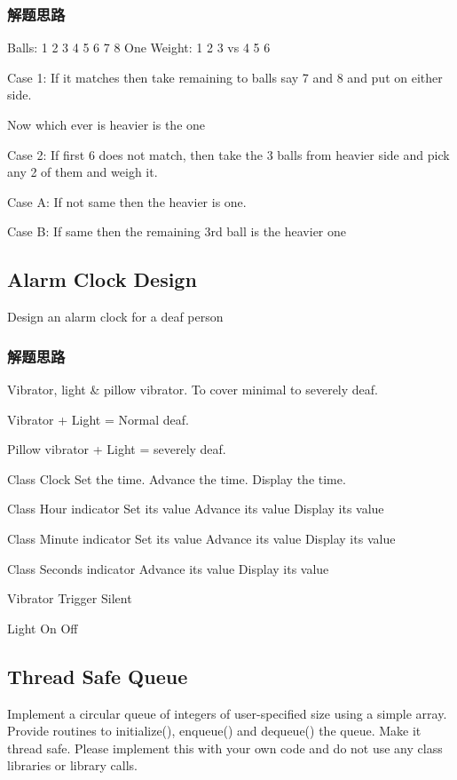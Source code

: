 \subsubsection{解题思路}
Balls: 1 2 3 4 5 6 7 8
One Weight: {1 2 3} vs {4 5 6}

Case 1: 
	If it matches then take remaining to balls say 7 and 8 and put on either side. 
	
	Now which ever is heavier is the one 

Case 2: 
	If first 6 does not match, then take the 3 balls from heavier side and pick any 2 of them and weigh it. 

Case A: 
	If not same then the heavier is one. 

Case B: 
	If same then the remaining 3rd ball is the heavier one

\subsection{Alarm Clock Design}
Design an alarm clock for a deaf person

\subsubsection{解题思路}

Vibrator, light \& pillow vibrator. To cover minimal to severely deaf. 

Vibrator + Light = Normal deaf. 

Pillow vibrator + Light = severely deaf.

\begin{Code}
	Class Clock
		Set the time.
		Advance the time.
		Display the time.
	
	Class Hour indicator
		Set its value
		Advance its value
		Display its value
	
	Class Minute indicator
		Set its value
		Advance its value
		Display its value
	
	Class Seconds indicator
		Advance its value
		Display its value
	
	Vibrator
		Trigger
		Silent
	
	Light
		On
		Off
\end{Code}

\subsection{Thread Safe Queue}
Implement a circular queue of integers of user-specified size using a simple array. Provide routines to initialize(), enqueue() and dequeue() the queue. Make it thread safe. 
Please implement this with your own code and do not use any class libraries or library calls.

